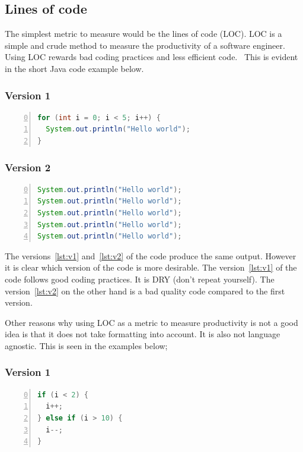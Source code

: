 \documentclass{article}
\begin{document}
\subsection{Lines of code}
The simplest metric to measure would be the lines of code (LOC). LOC is a
simple and crude method to measure the productivity of a software engineer.
Using LOC rewards bad coding practices and less efficient
code.~\cite{fenton1999software} This is evident in the short Java code example
below.

\subsubsection{Version 1}
\begin{lstlisting}[language=Java,frame=single,firstnumber=0,numbers=left,label={lst:v1}]
for (int i = 0; i < 5; i++) {
  System.out.println("Hello world");
}
\end{lstlisting}

\subsubsection{Version 2}
\begin{lstlisting}[language=Java,frame=single,firstnumber=0,numbers=left,label={lst:v2}]
System.out.println("Hello world");
System.out.println("Hello world");
System.out.println("Hello world");
System.out.println("Hello world");
System.out.println("Hello world");
\end{lstlisting}

The versions~\ref{lst:v1} and~\ref{lst:v2} of the code produce the same output.
However it is clear which version of the code is more desirable. The
version~\ref{lst:v1} of the code follows good coding practices. It is DRY
(don't repeat yourself). The version~\ref{lst:v2} on the other hand is a bad
quality code compared to the first version.

Other reasons why using LOC as a metric to measure productivity is not a good
idea is that it does not take formatting into account. It is also not language
agnostic. This is seen in the examples below;

\subsubsection{Version 1}
\begin{lstlisting}[language=Java,frame=single,firstnumber=0,numbers=left,label={lst:fmtv1}]
if (i < 2) {
  i++;
} else if (i > 10) {
  i--;
}
\end{lstlisting}
\end{document}
